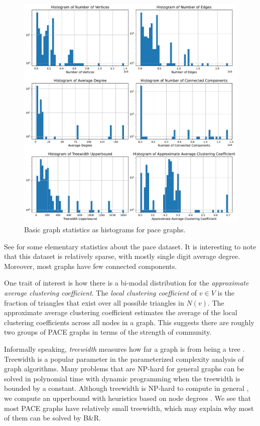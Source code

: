 \documentclass{article}
\begin{document}
\begin{figure}
     \centering
     \includegraphics[width=\textwidth]{figures/pace_unweighted}
     \caption{Basic graph statistics as histograms for pace graphs.}
     \label{fig:pace_unweighted}
\end{figure}

See  for some elementary statistics about the pace dataset.
It is interesting to note that this dataset is relatively sparse,
with mostly single digit average degree.
Moreover, most graphs have few connected components.

One trait of interest is how there is a bi-modal distribution for the \emph{approximate average clustering coefficient}.
The \emph{local clustering coefficient} of $v\in V$
is the fraction of triangles that exist over all possible triangles in $N(v)$.
The approximate average clustering coefficient
estimates the average of the local clustering coefficients across all nodes in a graph.
This suggests there are roughly two groups of PACE graphs in terms of the strength of community.

Informally speaking, \emph{treewidth} measures how far a graph is from being a tree \citet{robertson1986graph}.
Treewidth is a popular parameter in the parameterized complexity analysis of graph algorithms.
Many problems that are NP-hard for general graphs can be solved in polynomial time
with dynamic programming
when the treewidth is bounded by a constant.
Although treewidth is NP-hard to compute in general \citet{treewidth_hardness},
we compute an upperbound with heuristics based on node degrees \citet{bodlaender2010treewidth}.
We see that most PACE graphs have relatively small treewidth,
which may explain why most of them can be solved by B\&R.
\end{document}
